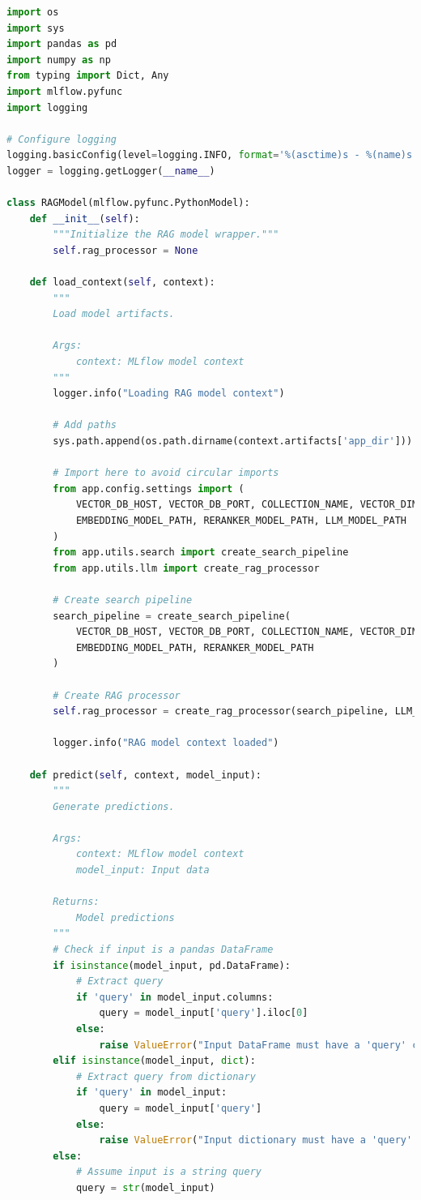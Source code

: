 \documentclass[
  screen,review,acmlarge]{acmart}
\begin{document}
\begin{lstlisting}[language=Python]
import os
import sys
import pandas as pd
import numpy as np
from typing import Dict, Any
import mlflow.pyfunc
import logging

# Configure logging
logging.basicConfig(level=logging.INFO, format='%(asctime)s - %(name)s - %(levelname)s - %(message)s')
logger = logging.getLogger(__name__)

class RAGModel(mlflow.pyfunc.PythonModel):
    def __init__(self):
        """Initialize the RAG model wrapper."""
        self.rag_processor = None
    
    def load_context(self, context):
        """
        Load model artifacts.
        
        Args:
            context: MLflow model context
        """
        logger.info("Loading RAG model context")
        
        # Add paths
        sys.path.append(os.path.dirname(context.artifacts['app_dir']))
        
        # Import here to avoid circular imports
        from app.config.settings import (
            VECTOR_DB_HOST, VECTOR_DB_PORT, COLLECTION_NAME, VECTOR_DIMENSION,
            EMBEDDING_MODEL_PATH, RERANKER_MODEL_PATH, LLM_MODEL_PATH
        )
        from app.utils.search import create_search_pipeline
        from app.utils.llm import create_rag_processor
        
        # Create search pipeline
        search_pipeline = create_search_pipeline(
            VECTOR_DB_HOST, VECTOR_DB_PORT, COLLECTION_NAME, VECTOR_DIMENSION,
            EMBEDDING_MODEL_PATH, RERANKER_MODEL_PATH
        )
        
        # Create RAG processor
        self.rag_processor = create_rag_processor(search_pipeline, LLM_MODEL_PATH)
        
        logger.info("RAG model context loaded")
    
    def predict(self, context, model_input):
        """
        Generate predictions.
        
        Args:
            context: MLflow model context
            model_input: Input data
            
        Returns:
            Model predictions
        """
        # Check if input is a pandas DataFrame
        if isinstance(model_input, pd.DataFrame):
            # Extract query
            if 'query' in model_input.columns:
                query = model_input['query'].iloc[0]
            else:
                raise ValueError("Input DataFrame must have a 'query' column")
        elif isinstance(model_input, dict):
            # Extract query from dictionary
            if 'query' in model_input:
                query = model_input['query']
            else:
                raise ValueError("Input dictionary must have a 'query' key")
        else:
            # Assume input is a string query
            query = str(model_input)
        

\end{lstlisting}
\end{document}
